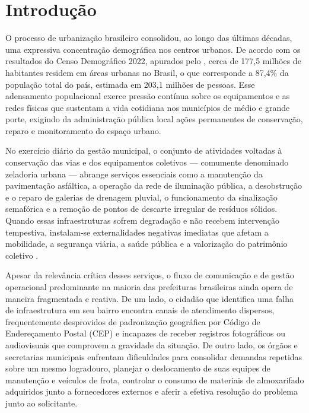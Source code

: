 \chapter{Introdução}
\label{cap:introducao}

O processo de urbanização brasileiro consolidou, ao longo das últimas décadas, uma expressiva concentração demográfica nos centros urbanos. De acordo com os resultados do Censo Demográfico 2022, apurados pelo , cerca de 177,5 milhões de habitantes residem em áreas urbanas no Brasil, o que corresponde a 87,4\% da população total do país, estimada em 203,1 milhões de pessoas. Esse adensamento populacional exerce pressão contínua sobre os equipamentos e as redes físicas que sustentam a vida cotidiana nos municípios de médio e grande porte, exigindo da administração pública local ações permanentes de conservação, reparo e monitoramento do espaço urbano.

No exercício diário da gestão municipal, o conjunto de atividades voltadas à conservação das vias e dos equipamentos coletivos --- comumente denominado zeladoria urbana --- abrange serviços essenciais como a manutenção da pavimentação asfáltica, a operação da rede de iluminação pública, a desobstrução e o reparo de galerias de drenagem pluvial, o funcionamento da sinalização semafórica e a remoção de pontos de descarte irregular de resíduos sólidos. Quando essas infraestruturas sofrem degradação e não recebem intervenção tempestiva, instalam-se externalidades negativas imediatas que afetam a mobilidade, a segurança viária, a saúde pública e a valorização do patrimônio coletivo \cite{ibge2025entorno, snis2023drenagem}.

Apesar da relevância crítica desses serviços, o fluxo de comunicação e de gestão operacional predominante na maioria das prefeituras brasileiras ainda opera de maneira fragmentada e reativa. De um lado, o cidadão que identifica uma falha de infraestrutura em seu bairro encontra canais de atendimento dispersos, frequentemente desprovidos de padronização geográfica por Código de Endereçamento Postal (CEP) e incapazes de receber registros fotográficos ou audiovisuais que comprovem a gravidade da situação. De outro lado, os órgãos e secretarias municipais enfrentam dificuldades para consolidar demandas repetidas sobre um mesmo logradouro, planejar o deslocamento de suas equipes de manutenção e veículos de frota, controlar o consumo de materiais de almoxarifado adquiridos junto a fornecedores externos e aferir a efetiva resolução do problema junto ao solicitante.

